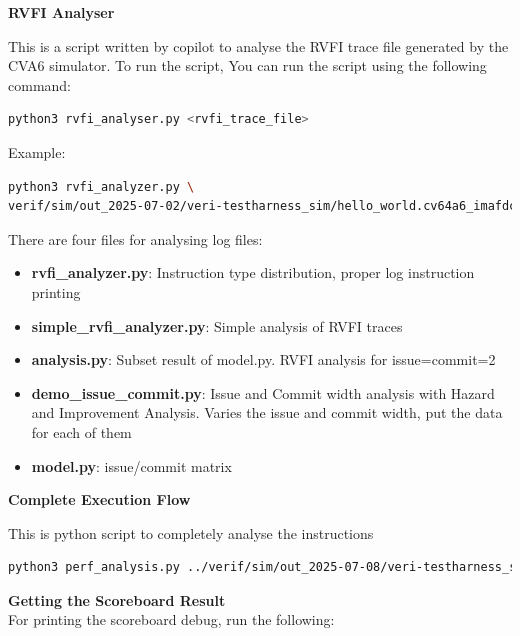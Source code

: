 \documentclass[12pt, a4paper]{article}
\begin{document}
\vspace{0.5em}

\textbf{RVFI Analyser}

This is a script written by copilot to analyse the RVFI trace file generated by the CVA6 simulator. To run the script, You can run the script using the following command:

\begin{lstlisting}[language=bash, frame=single, basicstyle=\ttfamily, numbers=none]
   python3 rvfi_analyser.py <rvfi_trace_file>
\end{lstlisting}

Example:
\begin{lstlisting}[language=bash, frame=single, 
    basicstyle=\ttfamily, numbers=none]
python3 rvfi_analyzer.py \
verif/sim/out_2025-07-02/veri-testharness_sim/hello_world.cv64a6_imafdc_sv39.log
\end{lstlisting}      

There are four files for analysing log files:
\begin{itemize}
    \item \textbf{rvfi\_analyzer.py}: Instruction type distribution, proper log instruction printing
    \item \textbf{simple\_rvfi\_analyzer.py}: Simple analysis of RVFI traces
    \item \textbf{analysis.py}: Subset result of model.py. RVFI analysis for issue=commit=2
    \item \textbf{demo\_issue\_commit.py}: Issue and Commit width analysis with Hazard and Improvement Analysis. Varies the issue and commit width, put the data for each of them
    \item \textbf{model.py}: issue/commit matrix
\end{itemize}


\textbf{Complete Execution Flow}

This is python script to completely analyse the instructions

\begin{lstlisting}[language=bash, frame=single, basicstyle=\ttfamily\footnotesize, numbers=none]
python3 perf_analysis.py ../verif/sim/out_2025-07-08/veri-testharness_sim/multiply.cv64a6_imafdc_sv39.log --performance --save-terminal-output corrected_test.txt --colors
\end{lstlisting}

\textbf{Getting the Scoreboard Result\\}
For printing the scoreboard debug, run the following:
\end{document}
